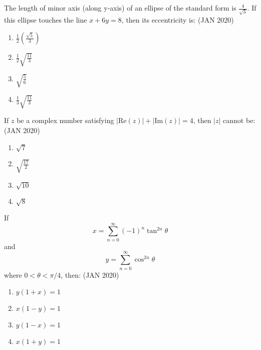     \item The length of minor axis (along y-axis) of an ellipse of the standard form is $\frac{4}{\sqrt{3}}$. If this ellipse touches the line $x+6y=8$, then its eccentricity is: \hfill{(JAN 2020)}

        \begin{enumerate}
        \item $\frac{1}{2}\left(\frac{\sqrt{5}}{3}\right)$
        \item $\frac{1}{2}\sqrt{\frac{11}{3}}$
        \item $\sqrt{\frac{5}{6}}$
        \item $\frac{1}{3}\sqrt{\frac{11}{3}}$
        \end{enumerate}  

    \item If $z$ be a complex number satisfying $|\text{Re}(z)|+|\text{Im}(z)|=4$, then $|z|$ cannot be: \hfill{(JAN 2020)}

        \begin{enumerate}
        \item $\sqrt{7}$
        \item $\sqrt{\frac{17}{2}}$
        \item $\sqrt{10}$
        \item $\sqrt{8}$
        \end{enumerate}

    \item If        
        \[x=\sum_{n=0}^{\infty}(-1)^{n}\tan^{2n}\theta\]  
        and
        \[y=\sum_{n=0}^{\infty}\cos^{2n}\theta\]
        where $0<\theta<\pi/4$, then: \hfill{(JAN 2020)}
        
        \begin{enumerate}
        \item $y(1+x)=1$
        \item $x(1-y)=1$
        \item $y(1-x)=1$
        \item $x(1+y)=1$
        \end{enumerate}

    


